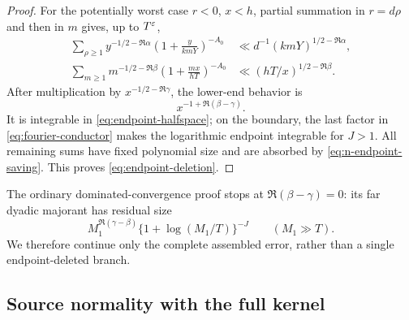 \begin{proof}
For the potentially worst case $r<0$, $x<h$, partial summation in
$r=d\rho$ and then in $m$ gives, up to $T^\varepsilon$,
\begin{align}
 \sum_{\rho\geq1}y^{-1/2-\Re\alpha}
 \left(1+\frac{y}{kmY}\right)^{-A_0}
 &\ll d^{-1}(kmY)^{1/2-\Re\alpha},\label{eq:rho-endpoint-sum}\\
 \sum_{m\geq1}m^{-1/2-\Re\beta}
 \left(1+\frac{mx}{hT}\right)^{-A_0}
 &\ll(hT/x)^{1/2-\Re\beta}.
 \label{eq:m-endpoint-sum}
\end{align}
After multiplication by $x^{-1/2-\Re\gamma}$, the lower-end behavior is
\begin{equation}\label{eq:endpoint-integrability}
                          x^{-1+\Re(\beta-\gamma)}.
\end{equation}
It is integrable in \eqref{eq:endpoint-halfspace}; on the boundary, the last
factor in \eqref{eq:fourier-conductor} makes the logarithmic endpoint
integrable for $J>1$.  All remaining sums have fixed polynomial size and are
absorbed by \eqref{eq:n-endpoint-saving}.  This proves
\eqref{eq:endpoint-deletion}.
\end{proof}

The ordinary dominated-convergence proof stops at
$\Re(\beta-\gamma)=0$: its far dyadic majorant has residual size
\begin{equation}\label{eq:far-tail-obstruction}
 M_1^{\Re(\gamma-\beta)}
 \{1+\log(M_1/T)\}^{-J}\qquad(M_1\gg T).
\end{equation}
We therefore continue only the complete assembled error, rather than a
single endpoint-deleted branch.

\subsection{Source normality with the full kernel}

